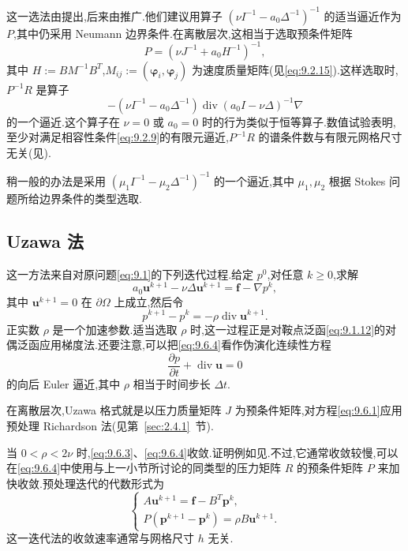 这一选法由提出,后来由推广.他们建议用算子 \((\nu I^{-1}-a_0\Delta^{-1})^{-1}\) 的适当逼近作为 \(P\),其中仍采用 Neumann 边界条件.在离散层次,这相当于选取预条件矩阵
\[
  P=(\nu J^{-1}+a_0H^{-1})^{-1},
\]
其中 \(H:=BM^{-1}B^T\),\(M_{ij}:=(\boldsymbol{\varphi}_i,\boldsymbol{\varphi}_j)\) 为速度质量矩阵(见\eqref{eq:9.2.15}).这样选取时,\(P^{-1}R\) 是算子
\[
  -(\nu I^{-1}-a_0\Delta^{-1})
        \operatorname{div}(a_0I-\nu\Delta)^{-1}\nabla
\]
的一个逼近.这个算子在 \(\nu=0\) 或 \(a_0=0\) 时的行为类似于恒等算子.数值试验表明,至少对满足相容性条件\eqref{eq:9.2.9}的有限元逼近,\(P^{-1}R\) 的谱条件数与有限元网格尺寸无关(见).

稍一般的办法是采用 \((\mu_1I^{-1}-\mu_2\Delta^{-1})^{-1}\) 的一个逼近,其中 \(\mu_1,\mu_2\) 根据 Stokes 问题所给边界条件的类型选取.

\subsection{Uzawa 法}\label{sec:9.6.2}

这一方法来自对原问题\eqref{eq:9.1}的下列迭代过程.给定 \(p^0\),对任意 \(k\ge0\),求解
\begin{equation}\label{eq:9.6.3}
  a_0\boldsymbol{u}^{k+1}-\nu\Delta\boldsymbol{u}^{k+1}=\boldsymbol{f}-\nabla p^k,
\end{equation}
其中 \(\boldsymbol{u}^{k+1}=0\) 在 \(\partial\Omega\) 上成立,然后令
\begin{equation}\label{eq:9.6.4}
  p^{k+1}-p^k=-\rho\operatorname{div}\boldsymbol{u}^{k+1}.
\end{equation}
正实数 \(\rho\) 是一个加速参数.适当选取 \(\rho\) 时,这一过程正是对鞍点泛函\eqref{eq:9.1.12}的对偶泛函应用梯度法.还要注意,可以把\eqref{eq:9.6.4}看作伪演化连续性方程
\[
  \frac{\partial p}{\partial t}+\operatorname{div}\boldsymbol{u}=0
\]
的向后 Euler 逼近,其中 \(\rho\) 相当于时间步长 \(\Delta t\).

在离散层次,Uzawa 格式就是以压力质量矩阵 \(J\) 为预条件矩阵,对方程\eqref{eq:9.6.1}应用预处理 Richardson 法(见第~\ref{sec:2.4.1}~节).

当 \(0<\rho<2\nu\) 时,\eqref{eq:9.6.3}、\eqref{eq:9.6.4}收敛.证明例如见.不过,它通常收敛较慢,可以在\eqref{eq:9.6.4}中使用与上一小节所讨论的同类型的压力矩阵 \(R\) 的预条件矩阵 \(P\) 来加快收敛.预处理迭代的代数形式为
\begin{equation}\label{eq:9.6.5}
  \begin{cases}
    A\boldsymbol{u}^{k+1}=\boldsymbol{f}-B^T\boldsymbol{p}^k,\\
    P(\boldsymbol{p}^{k+1}-\boldsymbol{p}^k)=\rho B\boldsymbol{u}^{k+1}.
  \end{cases}
\end{equation}
这一迭代法的收敛速率通常与网格尺寸 \(h\) 无关.

